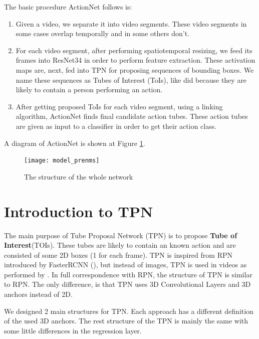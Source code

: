 The basic procedure ActionNet follows is:
\begin{enumerate}
\item Given a video, we separate it into video segments. These video segments in some cases overlap temporally and in some others don't.
\item For each video segment, after performing spatiotemporal resizing, we feed its frames into ResNet34 in order to perform feature
  extraction. These activation maps are, next, fed into TPN for proposing sequences of bounding boxes. We name these sequences as Tubes of Interest (ToIs), 
  like \cite{DBLP:journals/corr/HouCS17} did because they are likely to contain a person performing an action.
\item After getting proposed ToIs for each video segment, using a linking algorithm, ActionNet finds final candidate action tubes. These
  action tubes are given as input to a classifier in order to get their action class.
\end{enumerate}

A diagram of ActionNet is shown at Figure \ref{fig:whole_network_}.

\begin{figure}[h]
  \centering
  \texttt{[image: model\_prenms]}
  \caption{The structure of the whole network}
  \label{fig:whole_network_}
\end{figure}

\section{Introduction to TPN}
 The main purpose of Tube Proposal Network (TPN)  is to propose
\textbf{Tube of Interest}(TOIs). These tubes are likely to contain an known action and are consisted of some 2D boxes
(1 for each frame). TPN is inspired from RPN introduced by FasterRCNN (\cite{Ren:2015:FRT:2969239.2969250}), but instead of images, TPN
is used in videos as performed by \cite{DBLP:journals/corr/HouCS17}. In full correspondence with RPN, the structure
of TPN is similar to RPN. The only difference, is that TPN uses 3D Convolutional Layers and 3D anchors instead of 2D. \par
We designed 2 main structures for TPN. Each approach has a different definition of the used 3D anchors.
The rest structure of the TPN is mainly the same with some little differences in the regression layer. \par


